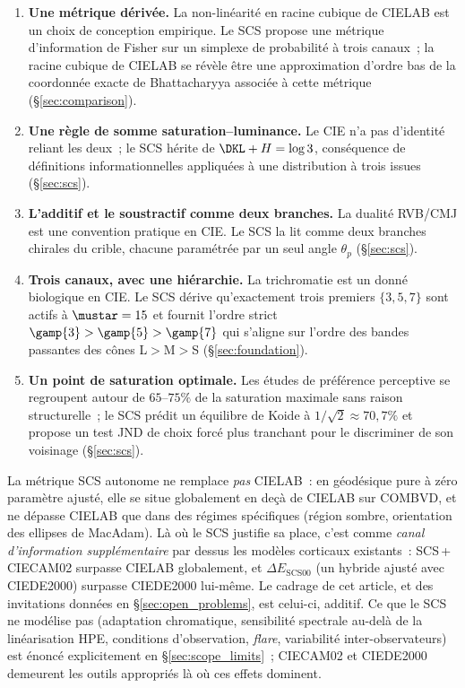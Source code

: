 \documentclass[12pt,a4paper]{article}
\begin{document}
\begin{enumerate}[nosep]
\item \textbf{Une m\'etrique d\'eriv\'ee.} La non-lin\'earit\'e en
  racine cubique de CIELAB est un choix de conception empirique. Le
  SCS propose une m\'etrique d'information de Fisher sur un simplexe
  de probabilit\'e \`a trois canaux~; la racine cubique de CIELAB se
  r\'ev\`ele \^etre une approximation d'ordre bas de la coordonn\'ee
  exacte de Bhattacharyya associ\'ee \`a cette m\'etrique
  (\S\ref{sec:comparison}).
\item \textbf{Une r\`egle de somme saturation--luminance.} Le CIE n'a
  pas d'identit\'e reliant les deux~; le SCS h\'erite de
  $\DKL + H = \log 3$, cons\'equence de d\'efinitions
  informationnelles appliqu\'ees \`a une distribution \`a trois issues
  (\S\ref{sec:scs}).
\item \textbf{L'additif et le soustractif comme deux branches.} La
  dualit\'e RVB/CMJ est une convention pratique en CIE. Le SCS la lit
  comme deux branches chirales du crible, chacune param\'etr\'ee par
  un seul angle $\theta_p$ (\S\ref{sec:scs}).
\item \textbf{Trois canaux, avec une hi\'erarchie.} La trichromatie est
  un donn\'e biologique en CIE. Le SCS d\'erive qu'exactement trois
  premiers $\{3, 5, 7\}$ sont actifs \`a $\mustar = 15$ et fournit
  l'ordre strict $\gamp{3} > \gamp{5} > \gamp{7}$ qui s'aligne sur
  l'ordre des bandes passantes des c\^ones L$>$M$>$S
  (\S\ref{sec:foundation}).
\item \textbf{Un point de saturation optimale.} Les \'etudes de
  pr\'ef\'erence perceptive se regroupent autour de $65$--$75\%$ de la
  saturation maximale sans raison structurelle~; le SCS pr\'edit un
  \'equilibre de Koide \`a $1/\sqrt{2} \approx 70{,}7\%$ et propose un
  test JND de choix forc\'e plus tranchant pour le discriminer de son
  voisinage (\S\ref{sec:scs}).
\end{enumerate}

La m\'etrique SCS autonome ne remplace \emph{pas} CIELAB~: en
g\'eod\'esique pure \`a z\'ero param\`etre ajust\'e, elle se situe
globalement en de\c{c}\`a de CIELAB sur COMBVD, et ne d\'epasse
CIELAB que dans des r\'egimes sp\'ecifiques (r\'egion sombre,
orientation des ellipses de MacAdam). L\`a o\`u le SCS justifie sa
place, c'est comme \emph{canal d'information suppl\'ementaire} par
dessus les mod\`eles corticaux existants~: SCS\,+\,CIECAM02 surpasse
CIELAB globalement, et $\Delta E_{\mathrm{SCS00}}$ (un hybride
ajust\'e avec CIEDE2000) surpasse CIEDE2000 lui-m\^eme. Le cadrage de
cet article, et des invitations donn\'ees en
\S\ref{sec:open_problems}, est celui-ci, additif. Ce que le SCS ne
mod\'elise pas (adaptation chromatique, sensibilit\'e spectrale
au-del\`a de la lin\'earisation HPE, conditions d'observation,
\emph{flare}, variabilit\'e inter-observateurs) est \'enonc\'e
explicitement en \S\ref{sec:scope_limits}~; CIECAM02 et CIEDE2000
demeurent les outils appropri\'es l\`a o\`u ces effets dominent.
\end{document}
